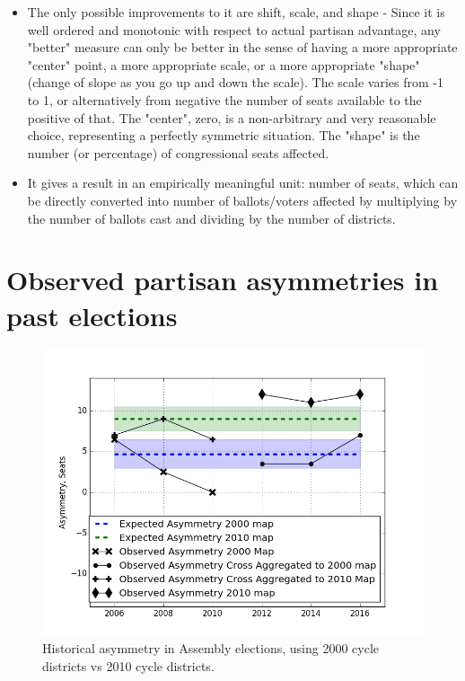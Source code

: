 \documentclass[preprint,12pt]{article}
\begin{document}
\begin{itemize}
\item The only possible improvements to it are shift, scale, and shape - Since it is well ordered and monotonic with respect to actual partisan advantage, any "better" measure can only be better in the sense of having a more appropriate "center" point, a more appropriate scale, or a more appropriate "shape" (change of slope as you go up and down the scale).  The scale varies from -1 to 1, or alternatively from negative the number of seats available to the positive of that.  The "center",  zero, is a non-arbitrary and very reasonable choice, representing a perfectly symmetric situation.   The "shape" is the number (or percentage) of congressional seats affected.

\item It gives a result in an empirically meaningful unit: number of seats, which can be directly converted into number of ballots/voters affected by multiplying by the number of ballots cast and dividing by the number of districts.

\end{itemize}


\section{Observed partisan asymmetries in past elections}

\begin{figure}[htb!]
    \begin{center}
        \includegraphics[scale=0.25]{../Figures/WI_compared/asymmetry.png}
        \caption{Historical asymmetry in Assembly elections, using 2000 cycle districts vs 2010 cycle districts.}\label{fig:Betas}
    \end{center}
\end{figure}
\end{document}
